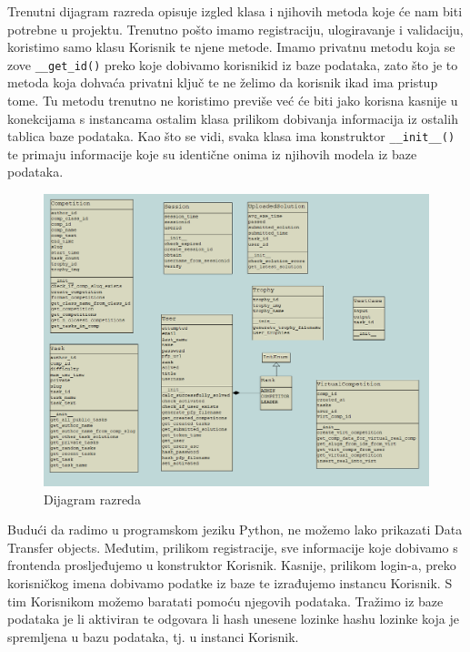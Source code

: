 			Trenutni dijagram razreda opisuje izgled klasa i njihovih metoda koje će nam biti potrebne u projektu. 
			Trenutno pošto imamo registraciju, ulogiravanje i validaciju, koristimo samo klasu Korisnik te njene metode. 
			Imamo privatnu metodu koja se zove \verb*|__get_id()| preko koje dobivamo korisnikid iz baze podataka,
			zato što je to metoda koja dohvaća privatni ključ te ne želimo da korisnik ikad ima pristup tome.
			Tu metodu trenutno ne koristimo previše već će biti jako korisna kasnije u konekcijama s instancama ostalim
			klasa prilikom dobivanja informacija iz ostalih tablica baze podataka. Kao što se vidi, svaka klasa ima 
			konstruktor \verb*|__init__()| te primaju informacije koje su identične onima iz njihovih modela iz baze podataka.

			\begin{figure}[H]
				\includegraphics[width=\textwidth]{slike/DijagramRazreda.png} %
				\caption{Dijagram razreda}
				\label{fig:DijagramRazreda} %
			\end{figure}	
			

			Budući da radimo u programskom jeziku Python, ne možemo lako prikazati Data Transfer objects.
			Međutim, prilikom registracije, sve informacije koje dobivamo s frontenda prosljeđujemo u konstruktor
			Korisnik. Kasnije, prilikom login-a, preko korisničkog imena dobivamo podatke iz baze te izrađujemo instancu Korisnik.
			S tim Korisnikom možemo baratati pomoću njegovih podataka. Tražimo iz baze podataka je li aktiviran te odgovara li
			hash unesene lozinke hashu lozinke koja je spremljena u bazu podataka, tj. u instanci Korisnik.

